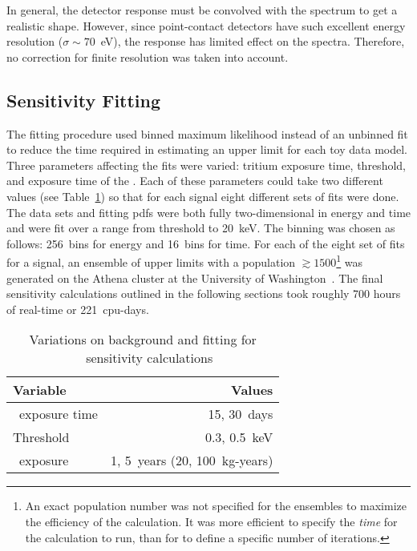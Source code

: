 	In general, the detector response must be convolved with the spectrum to get a realistic shape.  However, since point-contact detectors have such excellent energy resolution ($\sigma\sim70$~eV), the response has limited effect on the spectra.  Therefore, no correction for finite resolution was taken into account.  

		\subsection{Sensitivity Fitting}
		\label{sec:MJSensitivityFitting}
	
	The fitting procedure used binned maximum likelihood instead of an unbinned fit to reduce the time required in estimating an upper limit for each toy data model.  Three parameters affecting the fits were varied: tritium exposure time, threshold, and exposure time of the \minmod.  Each of these parameters could take two different values (see Table~\ref{tab:SensFitValues}) so that for each signal eight different sets of fits were done.  The data sets and fitting pdfs were both fully two-dimensional in energy and time and were fit over a range from threshold to 20~keV.  The binning was chosen as follows: 256~bins for energy and 16~bins for time.  For each of the eight set of fits for a signal, an ensemble of upper limits with a population $\gtrsim1500$\footnote{ An exact population number was not specified for the ensembles to maximize the efficiency of the calculation.  It was more efficient to specify the \emph{time} for the calculation to run, than for to define a specific number of iterations.} was generated on the Athena cluster at the University of Washington~\cite{Athena}.  The final sensitivity calculations outlined in the following sections took roughly 700 hours of real-time or 221~cpu-days.
	
			\begin{table}
				\centering
				\begin{tabular}{l r}
					\toprule
					Variable & Values \\
					\midrule
					\hthree~exposure time & 15, 30~days \\
					Threshold & 0.3, 0.5~keV \\
					\minmod~exposure & 1, 5~years (20, 100~kg-years) \\
					\bottomrule 
				\end{tabular}				
				\caption[Variations on background and fitting for \MJ~\minmod~sensitivity calculations]
				{Variations on background and fitting for \MJ~\minmod~sensitivity calculations}
				\label{tab:SensFitValues}
			\end{table}		
		
